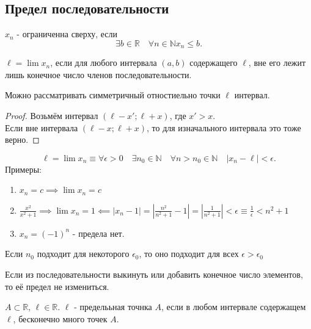 \documentclass[11pt, oneside]{article}   	%
\begin{document}
    \subsection{Предел последовательности}
        \begin{definition}
            $x_n$ - ограниченна сверху, если
            \[ \exists{b \in \mathbb{R}}\quad \forall{n \in \mathbb{N}} x_n \le b  .\] 
        \end{definition}
        \begin{definition}
             $\ell = \lim x_n$, если для любого интервала $(a, b)$ содержащего  $\ell$, вне его лежит лишь конечное число членов последовательности.
        \end{definition}
        \begin{tlemma}
            Можно рассматривать симметричный отностиельно точки $\ell$ интервал.\\
            \begin{proof}
                Возьмём интервал  $\left( \ell-x'; \ell+x \right) $, где $x'>x$.\\
                Если вне интервала  $\left( \ell-x; \ell+x \right)$, то для изначального интервала это тоже верно.
            \end{proof}
        \end{tlemma}
        \begin{definition}
        \[\ell = \lim x_n \equiv  \forall{\epsilon >0}\quad \exists{n_0 \in \mathbb{N}}\quad \forall{n > n_0 \in \mathbb{N}}\quad |x_n-\ell|<\epsilon.\]
        Примеры:    
        \begin{enumerate}
            \item $x_n = c \implies \lim x_n = c$
            \item $\frac{x^2}{x^2+1} \implies \lim x_n=1 \impliedby |x_n-1|=|\frac{n^2}{n^2+1}-1|=|\frac{1}{n^2+1}|<\epsilon \equiv \frac{1}{\epsilon} < n^2+1$ 
            \item $x_n=\left( -1 \right)^{n}$ - предела нет.
        \end{enumerate}
        \end{definition}
        \begin{dlemma}
            Если $n_0$ подходит для некоторого  $\epsilon_0$, то оно подходит для всех $\epsilon > \epsilon_0$
        \end{dlemma}
        \begin{dlemma}
            Если из последовательности выкинуть или добавить конечное число элементов, то её предел не измениться.    
        \end{dlemma}
        \begin{definition}
            $A \subset \mathbb{R}$, $\ell \in \mathbb{R}$. $\ell$ - пределььная точнка  $A$, если в любом интервале содержащем  $\ell$, бесконечно много точек  $A$.
        \end{definition}
\end{document}
